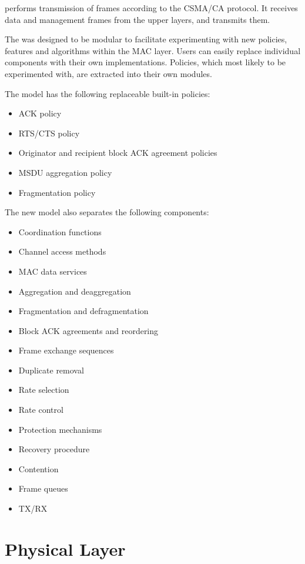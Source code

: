  performs transmission of frames according
to the CSMA/CA protocol. It receives data and management frames from
the upper layers, and transmits them.

The  was designed to be modular to facilitate experimenting
with new policies, features and algorithms within the MAC layer. Users can
easily replace individual components with their own implementations. Policies,
which most likely to be experimented with, are extracted into their own modules.

The model has the following replaceable built-in policies:

\begin{itemize}
  \item ACK policy
  \item RTS/CTS policy
  \item Originator and recipient block ACK agreement policies
  \item MSDU aggregation policy
  \item Fragmentation policy
\end{itemize}

The new model also separates the following components:

\begin{itemize}
  \item Coordination functions
  \item Channel access methods
  \item MAC data services
  \item Aggregation and deaggregation
  \item Fragmentation and defragmentation
  \item Block ACK agreements and reordering
  \item Frame exchange sequences
  \item Duplicate removal
  \item Rate selection
  \item Rate control
  \item Protection mechanisms
  \item Recovery procedure
  \item Contention
  \item Frame queues
  \item TX/RX
\end{itemize}

\section{Physical Layer}
\label{sec:80211:physical-layer}

